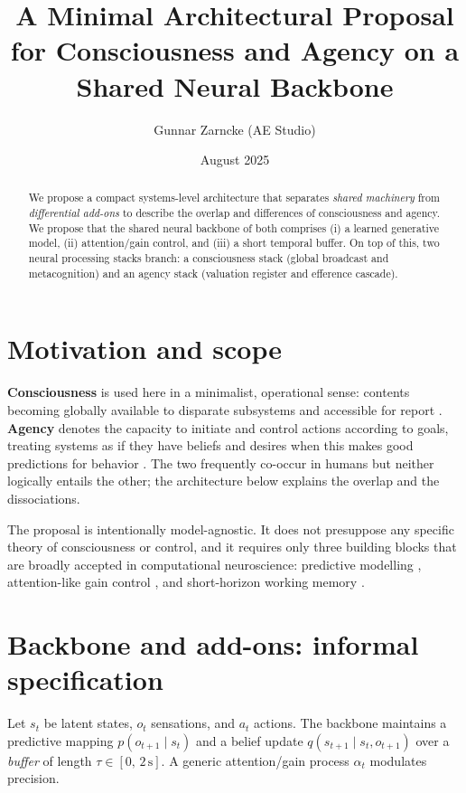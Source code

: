 \documentclass[11pt]{article}
\title{A Minimal Architectural Proposal for Consciousness and Agency on a Shared Neural Backbone}
\author{Gunnar Zarncke (AE Studio)}
\date{August 2025}
\begin{document}
\maketitle

\begin{abstract}
We propose a compact systems-level architecture that separates \emph{shared machinery} from \emph{differential add-ons} to describe the overlap and differences of consciousness and agency. 
We propose that the shared neural backbone of both comprises (i) a learned generative model, (ii) attention/gain control, and (iii) a short temporal buffer. 
On top of this, two neural processing stacks branch: a consciousness stack (global broadcast and metacognition) and an agency stack (valuation register and efference cascade). 
\end{abstract}

\section{Motivation and scope}
\textbf{Consciousness} is used here in a minimalist, operational sense: contents becoming globally available to disparate subsystems and accessible for report \citep{dehaene2014consciousness, dehaene2001global}. 
\textbf{Agency} denotes the capacity to initiate and control actions according to goals, treating systems as if they have beliefs and desires when this makes good predictions for behavior \citep{dennett1987intentional, dennett1971intentional}. 
The two frequently co-occur in humans but neither logically entails the other; the architecture below explains the overlap and the dissociations.

The proposal is intentionally model-agnostic. It does not presuppose any specific theory of consciousness or control, and it requires only three building blocks that are broadly accepted in computational neuroscience: 
predictive modelling \citep{Friston2010}, attention-like gain control \citep{sarter2023attention}, and short-horizon working memory \citep{miller2015}.

\section{Backbone and add-ons: informal specification}
Let $s_t$ be latent states, $o_t$ sensations, and $a_t$ actions. 
The backbone maintains a predictive mapping $p(o_{t+1}\mid s_t)$ and a belief update $q(s_{t+1}\mid s_t,o_{t+1})$ over a \emph{buffer} of length $\tau\!\in\![0,\,2\,\mathrm{s}]$. 
A generic attention/gain process $\alpha_t$ modulates precision.
\end{document}
